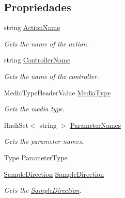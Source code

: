 \subsection*{Propriedades}
\begin{DoxyCompactItemize}
\item 
string \hyperlink{classApi3Layers_1_1Areas_1_1HelpPage_1_1HelpPageSampleKey_a8135668998be5ae89a1e1593179fcf25}{Action\+Name}
\begin{DoxyCompactList}\small\item\em Gets the name of the action. \end{DoxyCompactList}\item 
string \hyperlink{classApi3Layers_1_1Areas_1_1HelpPage_1_1HelpPageSampleKey_a20b7ad78149d99ebcad84e3e16b7b129}{Controller\+Name}
\begin{DoxyCompactList}\small\item\em Gets the name of the controller. \end{DoxyCompactList}\item 
Media\+Type\+Header\+Value \hyperlink{classApi3Layers_1_1Areas_1_1HelpPage_1_1HelpPageSampleKey_a9d8b52d08dc5154558fe38130fbfc2d8}{Media\+Type}
\begin{DoxyCompactList}\small\item\em Gets the media type. \end{DoxyCompactList}\item 
Hash\+Set$<$ string $>$ \hyperlink{classApi3Layers_1_1Areas_1_1HelpPage_1_1HelpPageSampleKey_a9efdb1d49c07c641e7732e96010efacc}{Parameter\+Names}
\begin{DoxyCompactList}\small\item\em Gets the parameter names. \end{DoxyCompactList}\item 
Type \hyperlink{classApi3Layers_1_1Areas_1_1HelpPage_1_1HelpPageSampleKey_a2ae793825ea8a822e7d0177bf7a29a28}{Parameter\+Type}
\item 
\hyperlink{namespaceApi3Layers_1_1Areas_1_1HelpPage_abad9f6d2b059d72558bf70415efc32b5}{Sample\+Direction} \hyperlink{classApi3Layers_1_1Areas_1_1HelpPage_1_1HelpPageSampleKey_a7f001c7cd8d8d35bc4613b02ca9d639c}{Sample\+Direction}
\begin{DoxyCompactList}\small\item\em Gets the \hyperlink{classApi3Layers_1_1Areas_1_1HelpPage_1_1HelpPageSampleKey_a7f001c7cd8d8d35bc4613b02ca9d639c}{Sample\+Direction}. \end{DoxyCompactList}\end{DoxyCompactItemize}


